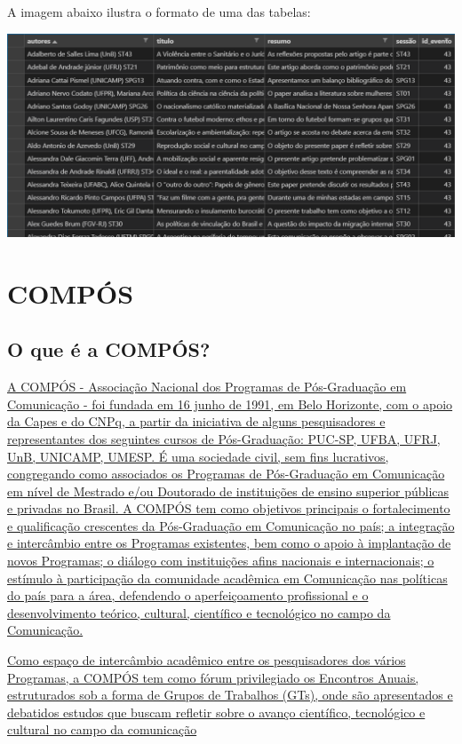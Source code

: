 \documentclass[
]{book}
\begin{document}
A imagem abaixo ilustra o formato de uma das tabelas:

\includegraphics{img/anpocs_scraper_csv.png}

\hypertarget{compuxf3s}{%
\chapter{COMPÓS}\label{compuxf3s}}

\hypertarget{o-que-uxe9-a-compuxf3s}{%
\section{O que é a COMPÓS?}\label{o-que-uxe9-a-compuxf3s}}

\href{https://www.compos.org.br/a_compos.php}{A COMPÓS - Associação Nacional dos Programas de Pós-Graduação em Comunicação - foi fundada em 16 junho de 1991, em Belo Horizonte, com o apoio da Capes e do CNPq, a partir da iniciativa de alguns pesquisadores e representantes dos seguintes cursos de Pós-Graduação: PUC-SP, UFBA, UFRJ, UnB, UNICAMP, UMESP. É uma sociedade civil, sem fins lucrativos, congregando como associados os Programas de Pós-Graduação em Comunicação em nível de Mestrado e/ou Doutorado de instituições de ensino superior públicas e privadas no Brasil. A COMPÓS tem como objetivos principais o fortalecimento e qualificação crescentes da Pós-Graduação em Comunicação no país; a integração e intercâmbio entre os Programas existentes, bem como o apoio à implantação de novos Programas; o diálogo com instituições afins nacionais e internacionais; o estímulo à participação da comunidade acadêmica em Comunicação nas políticas do país para a área, defendendo o aperfeiçoamento profissional e o desenvolvimento teórico, cultural, científico e tecnológico no campo da Comunicação.}

\href{https://www.compos.org.br/encontros_anuais.php}{Como espaço de intercâmbio acadêmico entre os pesquisadores dos vários Programas, a COMPÓS tem como fórum privilegiado os Encontros Anuais, estruturados sob a forma de Grupos de Trabalhos (GTs), onde são apresentados e debatidos estudos que buscam refletir sobre o avanço científico, tecnológico e cultural no campo da comunicação}
\end{document}

